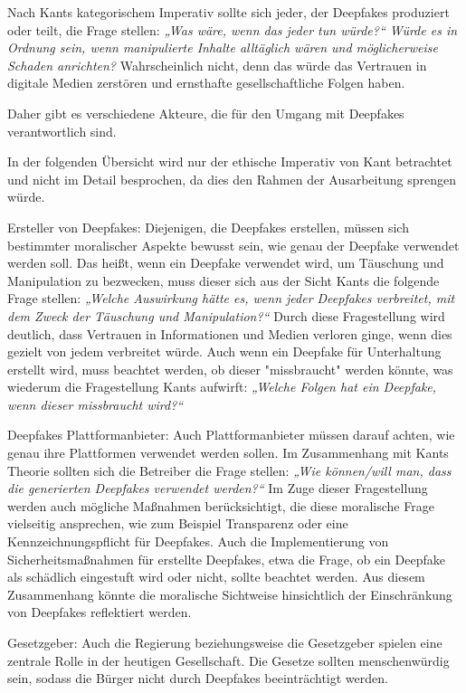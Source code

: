 \documentclass[a4paper,12pt]{article}
\begin{document}
Nach Kants kategorischem Imperativ sollte sich jeder, der Deepfakes produziert oder teilt, die Frage stellen: \textit{„Was wäre, wenn das jeder tun würde?“ Würde es in Ordnung sein, wenn manipulierte Inhalte alltäglich wären und möglicherweise Schaden anrichten?} Wahrscheinlich nicht, denn das würde das Vertrauen in digitale Medien zerstören und ernsthafte gesellschaftliche Folgen haben. \cite{KantMetaphysik}

Daher gibt es verschiedene Akteure, die für den Umgang mit Deepfakes verantwortlich sind.

In der folgenden Übersicht wird nur der ethische Imperativ von Kant betrachtet und nicht im Detail besprochen, da dies den Rahmen der Ausarbeitung sprengen würde.

Ersteller von Deepfakes:
Diejenigen, die Deepfakes erstellen, müssen sich bestimmter moralischer Aspekte bewusst sein, wie genau der Deepfake verwendet werden soll. Das heißt, wenn ein Deepfake verwendet wird, um Täuschung und Manipulation zu bezwecken, muss dieser sich aus der Sicht Kants die folgende Frage stellen: \textit{„Welche Auswirkung hätte es, wenn jeder Deepfakes verbreitet, mit dem Zweck der Täuschung und Manipulation?“} Durch diese Fragestellung wird deutlich, dass Vertrauen in Informationen und Medien verloren ginge, wenn dies gezielt von jedem verbreitet würde. Auch wenn ein Deepfake für Unterhaltung erstellt wird, muss beachtet werden, ob dieser "missbraucht" werden könnte, was wiederum die Fragestellung Kants aufwirft: \textit{„Welche Folgen hat ein Deepfake, wenn dieser missbraucht wird?“}\cite{IJS2025}\cite{KantMetaphysik}

Deepfakes Plattformanbieter:
Auch Plattformanbieter müssen darauf achten, wie genau ihre Plattformen verwendet werden sollen. Im Zusammenhang mit Kants Theorie sollten sich die Betreiber die Frage stellen: \textit{„Wie können/will man, dass die generierten Deepfakes verwendet werden?“} Im Zuge dieser Fragestellung werden auch mögliche Maßnahmen berücksichtigt, die diese moralische Frage vielseitig ansprechen, wie zum Beispiel Transparenz oder eine Kennzeichnungspflicht für Deepfakes. Auch die Implementierung von Sicherheitsmaßnahmen für erstellte Deepfakes, etwa die Frage, ob ein Deepfake als schädlich eingestuft wird oder nicht, sollte beachtet werden. Aus diesem Zusammenhang könnte die moralische Sichtweise hinsichtlich der Einschränkung von Deepfakes reflektiert werden. \cite{Brennan2024} \cite{KantMetaphysik}

Gesetzgeber:
Auch die Regierung beziehungsweise die Gesetzgeber spielen eine zentrale Rolle in der heutigen Gesellschaft. Die Gesetze sollten menschenwürdig sein, sodass die Bürger nicht durch Deepfakes beeinträchtigt werden. \cite{ThomsonReuters2024} \cite{KantMetaphysik}
\end{document}
